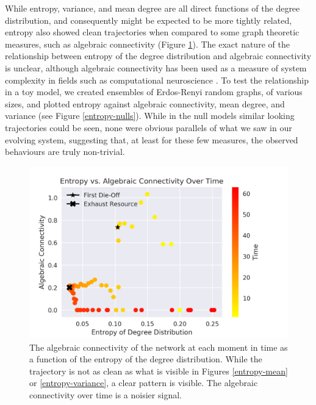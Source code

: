 \documentclass{paper}
\begin{document}
	While entropy, variance, and mean degree are all direct functions of the degree distribution, and consequently might be expected to be more tightly related, entropy also showed clean trajectories when compared to some graph theoretic measures, such as algebraic connectivity (Figure \ref{entropy-algconn}). The exact nature of the relationship between entropy of the degree distribution and algebraic connectivity is unclear, although algebraic connectivity has been used as a measure of system complexity in fields such as computational neuroscience \cite{bassett_adaptive_2006}. To test the relationship in a toy model, we created ensembles of Erdos-Renyi random graphs, of various sizes, and plotted entropy against algebraic connectivity, mean degree, and variance (see Figure \ref{entropy-nulls}). While in the null models similar looking trajectories could be seen, none were obvious parallels of what we saw in our evolving system, suggesting that, at least for these few measures, the observed behaviours are truly non-trivial. 
	
	\begin{figure}[h]
		\centering
		\includegraphics[scale=0.75]{ent_alg_conn.png}
		\caption{The algebraic connectivity of the network at each moment in time as a function of the entropy of the degree distribution. While the trajectory is not as clean as what is visible in Figures \ref{entropy-mean} or \ref{entropy-variance}, a clear pattern is visible. The algebraic connectivity over time is a noisier signal.}
		\label{entropy-algconn}
	\end{figure}
	
\end{document}
